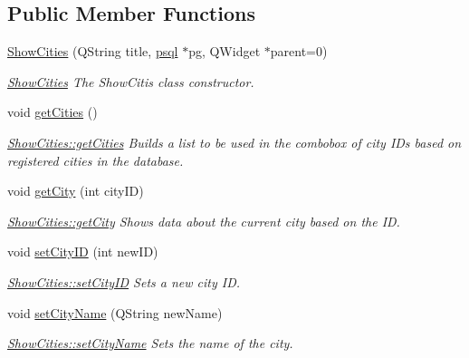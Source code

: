 \subsection*{Public Member Functions}
\begin{DoxyCompactItemize}
\item 
\mbox{\hyperlink{class_show_cities_a71a514390bebd22b5e6ecbb6b731979a}{Show\+Cities}} (Q\+String title, \mbox{\hyperlink{classpsql}{psql}} $\ast$pg, Q\+Widget $\ast$parent=0)
\begin{DoxyCompactList}\small\item\em \mbox{\hyperlink{class_show_cities}{Show\+Cities}} The Show\+Citis class constructor. \end{DoxyCompactList}\item 
\mbox{\label{class_show_cities_a8026675035c0bce6dab846262e1da0c5}} 
void \mbox{\hyperlink{class_show_cities_a8026675035c0bce6dab846262e1da0c5}{get\+Cities}} ()
\begin{DoxyCompactList}\small\item\em \mbox{\hyperlink{class_show_cities_a8026675035c0bce6dab846262e1da0c5}{Show\+Cities\+::get\+Cities}} Builds a list to be used in the combobox of city I\+Ds based on registered cities in the database. \end{DoxyCompactList}\item 
void \mbox{\hyperlink{class_show_cities_a7a03bcd5374073d6689aed90cc23ce5e}{get\+City}} (int city\+ID)
\begin{DoxyCompactList}\small\item\em \mbox{\hyperlink{class_show_cities_a7a03bcd5374073d6689aed90cc23ce5e}{Show\+Cities\+::get\+City}} Shows data about the current city based on the ID. \end{DoxyCompactList}\item 
void \mbox{\hyperlink{class_show_cities_acd17480ad6a64e989e9aa0b07d30141b}{set\+City\+ID}} (int new\+ID)
\begin{DoxyCompactList}\small\item\em \mbox{\hyperlink{class_show_cities_acd17480ad6a64e989e9aa0b07d30141b}{Show\+Cities\+::set\+City\+ID}} Sets a new city ID. \end{DoxyCompactList}\item 
void \mbox{\hyperlink{class_show_cities_acadd6c1bdb26d30e796bab4b5b2acfd9}{set\+City\+Name}} (Q\+String new\+Name)
\begin{DoxyCompactList}\small\item\em \mbox{\hyperlink{class_show_cities_acadd6c1bdb26d30e796bab4b5b2acfd9}{Show\+Cities\+::set\+City\+Name}} Sets the name of the city. \end{DoxyCompactList}\item 

\end{DoxyCompactItemize}

